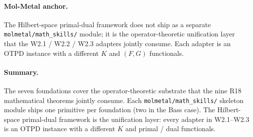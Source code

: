 \paragraph{Mol-Metal anchor.}
The Hilbert-space primal-dual framework does not ship as a
separate \texttt{molmetal/math\_skills/} module; it is the
operator-theoretic unification layer that the W2.1 / W2.2 / W2.3
adapters jointly consume.  Each adapter is an OTPD instance with
a different $K$ and $(F, G)$ functionals.

\paragraph{Summary.}
The seven foundations cover the operator-theoretic substrate that
the nine R18 mathematical theorems jointly consume.  Each
\texttt{molmetal/math\_skills/} skeleton module ships one
primitive per foundation (two in the Bass case).  The
Hilbert-space primal-dual framework is the unification layer: every
adapter in W2.1--W2.3 is an OTPD instance with a different $K$
and primal / dual functionals.

\endinput
